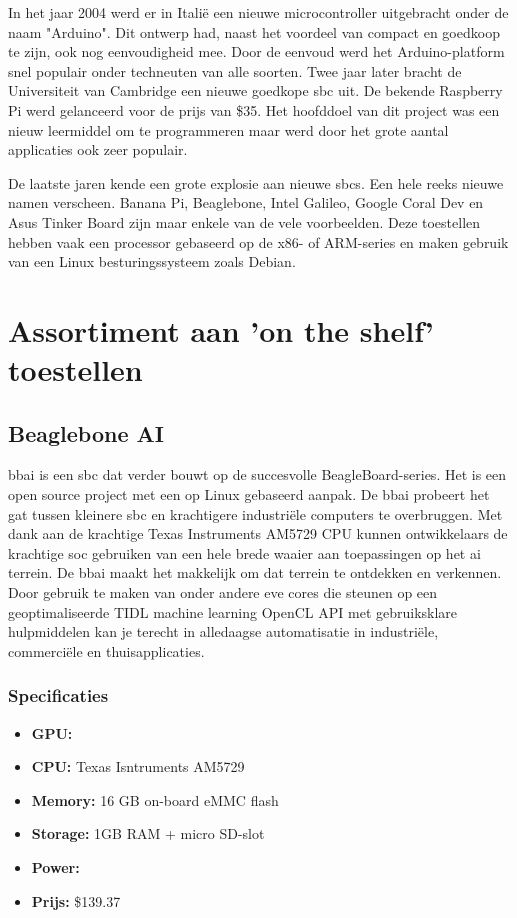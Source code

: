 	
	In het jaar 2004 werd er in Itali\"e een nieuwe microcontroller uitgebracht onder de naam "Arduino". Dit ontwerp had, naast het voordeel van compact en goedkoop te zijn, ook nog eenvoudigheid mee. Door de eenvoud werd het Arduino-platform snel populair onder techneuten van alle soorten. 
	Twee jaar later bracht de Universiteit van Cambridge een nieuwe goedkope \gls{sbc} uit. De bekende Raspberry Pi werd gelanceerd voor de prijs van \$35. Het hoofddoel van dit project was een nieuw leermiddel om te programmeren maar werd door het grote aantal applicaties ook zeer populair. \label{raspberry}
	
	De laatste jaren kende een grote explosie aan nieuwe \gls{sbc}s. Een hele reeks nieuwe namen verscheen. Banana Pi, Beaglebone, Intel Galileo, Google Coral Dev en Asus Tinker Board zijn maar enkele van de vele voorbeelden. Deze toestellen hebben vaak een processor gebaseerd op de x86- of ARM-series en maken gebruik van een Linux besturingssysteem zoals Debian.
	


\newpage


\section{Assortiment aan 'on the shelf' toestellen}

	\subsection{Beaglebone AI}
	\gls{bbai} is een \gls{sbc} dat verder bouwt op de succesvolle  BeagleBoard-series\citep{bron:bbai}. Het is een open source project met een op Linux gebaseerd aanpak. De \gls{bbai} probeert het gat tussen kleinere \gls{sbc} en krachtigere industri\"ele computers te overbruggen. Met dank aan de krachtige Texas Instruments AM5729 CPU kunnen ontwikkelaars de krachtige \gls{soc} gebruiken van een hele brede waaier aan toepassingen op het \gls{ai} terrein. De \gls{bbai} maakt het makkelijk om dat terrein te ontdekken en verkennen. Door gebruik te maken van onder andere \gls{eve} cores die steunen op een geoptimaliseerde TIDL machine learning OpenCL API met gebruiksklare hulpmiddelen kan je terecht in alledaagse automatisatie in industri\"ele, commerci\"ele en thuisapplicaties.
	
	
		\subsubsection{Specificaties}
		\begin{itemize}
			\item \textbf{GPU:} 
			\item \textbf{CPU:} Texas Isntruments AM5729
			\item \textbf{Memory:} 16 GB on-board eMMC flash
			\item \textbf{Storage:} 1GB RAM + micro SD-slot
			\item \textbf{Power:}
			\item \textbf{Prijs:} \$139.37
		\end{itemize}
	
